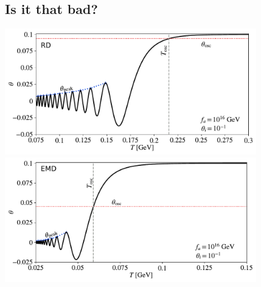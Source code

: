 \documentclass[10pt,utf8,compress,xcolor=dvipsnames]{beamer}
\begin{document}
\subsection{Is it that bad?}
\begin{frame}{\insertsubsectionhead}
	\begin{center}
		\vspace{-0.22cm}\includegraphics[width=0.82\textwidth]{figs/theta_evolution-RD.pdf}\\[-0.39cm]
		\includegraphics[width=0.82\textwidth]{figs/theta_evolution-EMD.pdf}
	\end{center}
\end{frame}
\end{document}
